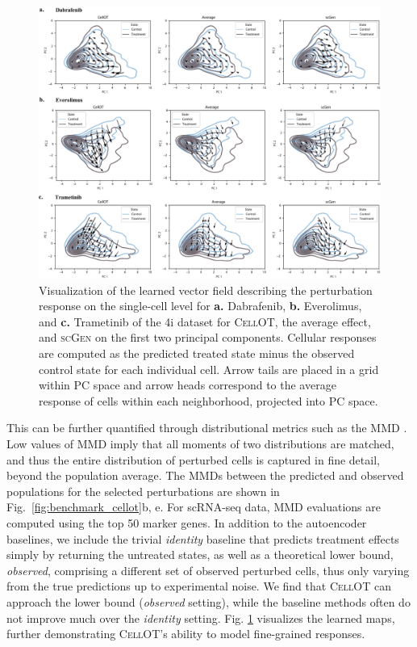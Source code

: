  \begin{figure}
     \centering
     \includegraphics[width=\textwidth]{figures/fig_4i_vector_fields.pdf}
     \caption{Visualization of the learned vector field describing the perturbation response on the single-cell level for \textbf{a.} Dabrafenib, \textbf{b.} Everolimus, and \textbf{c.} Trametinib of the 4i dataset for \textsc{CellOT}, the average effect, and \textsc{scGen} on the first two principal components. Cellular responses are computed as the predicted treated state minus the observed control state for each individual cell. Arrow tails are placed in a grid within PC space and arrow heads correspond to the average response of cells within each neighborhood, projected into PC space.}
     \label{fig:4i_vector_fields}
 \end{figure}

 This can be further quantified %
through distributional metrics such as the \acrfull{MMD} \citep{gretton2012kernel}.
Low values of \acrshort{MMD} imply that all moments of two distributions are matched, and thus the entire distribution of perturbed cells is captured in fine detail, beyond the population average.
The \acrshort{MMD}s between the predicted and observed populations for the selected perturbations are shown in Fig.~\ref{fig:benchmark_cellot}b, e.
For scRNA-seq data, \acrshort{MMD} evaluations are computed using the top 50 marker genes.
In addition to the autoencoder baselines, we include the trivial \emph{identity} baseline that predicts treatment effects simply by returning the untreated states,
as well as a theoretical lower bound, \emph{observed}, comprising a different set of observed perturbed cells, thus only varying from the true predictions up to experimental noise.
We find that \textsc{CellOT} can approach the lower bound (\emph{observed} setting), while the baseline methods often do not improve much over the \emph{identity} setting.
Fig. \ref{fig:4i_vector_fields} visualizes the learned maps, %
further demonstrating \textsc{CellOT}'s ability to model fine-grained responses.



